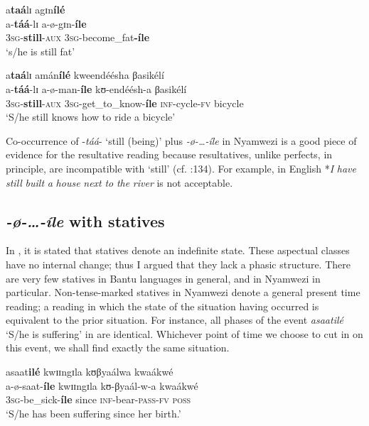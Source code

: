 \documentclass[output=paper,newtxmath,modfonts,nonflat,draftmode]{langsci/langscibook}
\begin{document}
\ea \label{ex:kanijo:17}
\ea
    \glll a\textbf{taá}lɪ     agɪn\textbf{ílé}\\ 
    a-\textbf{táá}-lɪ   a-ø-gɪn-\textbf{íle}\\
    3\textsc{sg}-\textbf{still}-\textsc{aux} 3\textsc{sg}-become\_fat\textbf{-íle}\\
    \glt ‘s/he is still fat’

\ex  
    \glll a\textbf{taá}lɪ    amán\textbf{ílé}    kweendéésha βasikélí\\
    a-\textbf{táá}-lɪ       a-ø-man-\textbf{íle}    kʊ-endéésh-a βasikélí\\
    3\textsc{sg}-\textbf{still}-\textsc{aux} 3\textsc{sg}-get\_to\_know-\textbf{íle} \textsc{inf}-cycle-\textsc{fv}   bicycle \\
    \glt ‘S/he still knows how to ride a bicycle’
\z
\z

Co-occurrence of -\textit{táá}- ‘still (being)’ plus \textit{-ø-\ldots-íle} in Nyamwezi is a good piece of evidence for the resultative reading because resultatives, unlike perfects, in principle, are incompatible with ‘still’ (cf. \citealt{Dahl1985}:134). For example, in English *\textit{I} \textit{have} \textit{still} \textit{built} \textit{a} \textit{house} \textit{next} \textit{to} \textit{the} \textit{river} is not acceptable.  

 \subsection{\textit{-ø-…-íle} with statives}
 

In , it is stated that statives denote an indefinite state. These aspectual classes have no internal change; thus I argued that they lack a phasic structure. There are very few statives in Bantu languages in general, and in Nyamwezi in particular. Non-tense-marked statives in Nyamwezi denote a general present time reading; a reading in which the state of the situation having occurred is equivalent to the prior situation. For instance, all phases of the event \textit{asaatilé} ‘S/he is suffering’ in  are identical. Whichever point of time we choose to cut in on this event, we shall find exactly the same situation. 

\ea \label{ex:kanijo:18}
\ea 
    \glll asaat\textbf{ilé}  kwɪɪngɪla  kʊβyaálwa  kwaákwé\\
    a-ø-saat-\textbf{íle}       kwɪɪngɪla kʊ-βyaál-w-a       kwaákwé\\
    3\textsc{sg}-be\_sick-\textbf{íle} since \textsc{inf}-bear-\textsc{pass}-\textsc{fv} \textsc{poss}\\
    \glt ‘S/he has been suffering since her birth.’
\end{document}
